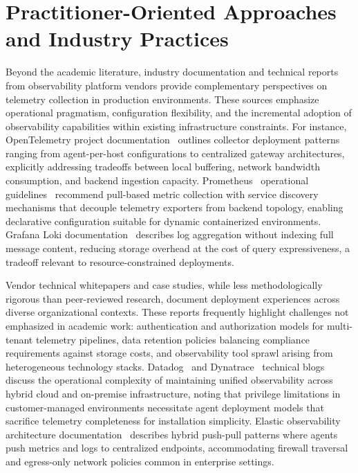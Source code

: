 \section{Practitioner-Oriented Approaches and Industry Practices}
\label{sec:practitioner-approaches}

Beyond the academic literature, industry documentation and technical reports from observability platform vendors provide complementary perspectives on telemetry collection in production environments. These sources emphasize operational pragmatism, configuration flexibility, and the incremental adoption of observability capabilities within existing infrastructure constraints. For instance, \gls{OpenTelemetry} project documentation~\parencite{opentelemetryCollectorDocs} outlines collector deployment patterns ranging from agent-per-host configurations to centralized gateway architectures, explicitly addressing tradeoffs between local buffering, network bandwidth consumption, and backend ingestion capacity. Prometheus~\cite{prometheus2016} operational guidelines~\parencite{prometheusOperationalGuide} recommend pull-based metric collection with service discovery mechanisms that decouple telemetry exporters from backend topology, enabling declarative configuration suitable for dynamic containerized environments. Grafana Loki documentation~\parencite{grafanaLokiDocs} describes log aggregation without indexing full message content, reducing storage overhead at the cost of query expressiveness, a tradeoff relevant to resource-constrained deployments.

Vendor technical whitepapers and case studies, while less methodologically rigorous than peer-reviewed research, document deployment experiences across diverse organizational contexts. These reports frequently highlight challenges not emphasized in academic work: authentication and authorization models for multi-tenant telemetry pipelines, data retention policies balancing compliance requirements against storage costs, and observability tool sprawl arising from heterogeneous technology stacks. Datadog~\parencite{datadogHybridCloud} and Dynatrace~\parencite{dynatraceObservability} technical blogs discuss the operational complexity of maintaining unified observability across hybrid cloud and on-premise infrastructure, noting that privilege limitations in customer-managed environments necessitate agent deployment models that sacrifice telemetry completeness for installation simplicity. Elastic observability architecture documentation~\parencite{elasticObservability} describes hybrid push-pull patterns where agents push metrics and logs to centralized endpoints, accommodating firewall traversal and egress-only network policies common in enterprise settings.


